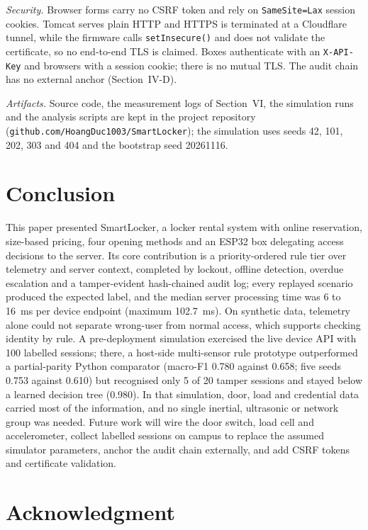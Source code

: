 \documentclass[journal,onecolumn]{IEEEtran}
\begin{document}
\textit{Security.} Browser forms carry no CSRF token and rely on \texttt{SameSite=Lax} session cookies. Tomcat serves
plain HTTP and HTTPS is terminated at a Cloudflare tunnel, while the firmware calls \texttt{setInsecure()} and does not
validate the certificate, so no end-to-end TLS is claimed. Boxes authenticate with an \texttt{X-API-Key} and browsers
with a session cookie; there is no mutual TLS. The audit chain has no external anchor (Section~IV-D).

\textit{Artifacts.} Source code, the measurement logs of Section~VI, the simulation runs and the analysis scripts are
kept in the project repository (\texttt{github.com/HoangDuc1003/SmartLocker}); the simulation uses seeds 42, 101, 202,
303 and 404 and the bootstrap seed 20261116.

\section{Conclusion}

This paper presented SmartLocker, a locker rental system with online reservation, size-based pricing, four opening
methods and an ESP32 box delegating access decisions to the server. Its core contribution is a priority-ordered rule
tier over telemetry and server context, completed by lockout, offline detection, overdue escalation and a tamper-evident
hash-chained audit log; every replayed scenario produced the expected label, and the median server processing time was
6 to 16~ms per device endpoint (maximum 102.7~ms). On synthetic data, telemetry alone could not separate wrong-user from
normal access, which supports checking identity by rule. A pre-deployment simulation exercised the live device API with
100 labelled sessions; there, a host-side multi-sensor rule prototype outperformed a partial-parity Python comparator
(macro-F1 0.780 against 0.658; five seeds 0.753 against 0.610) but recognised only 5 of 20 tamper sessions and stayed
below a learned decision tree (0.980). In that simulation, door, load and credential data carried most of the
information, and no single inertial, ultrasonic or network group was needed. Future work will wire the door switch,
load cell and accelerometer, collect labelled sessions on campus to replace the assumed simulator parameters, anchor
the audit chain externally, and add CSRF tokens and certificate validation.

\section*{Acknowledgment}
\end{document}
